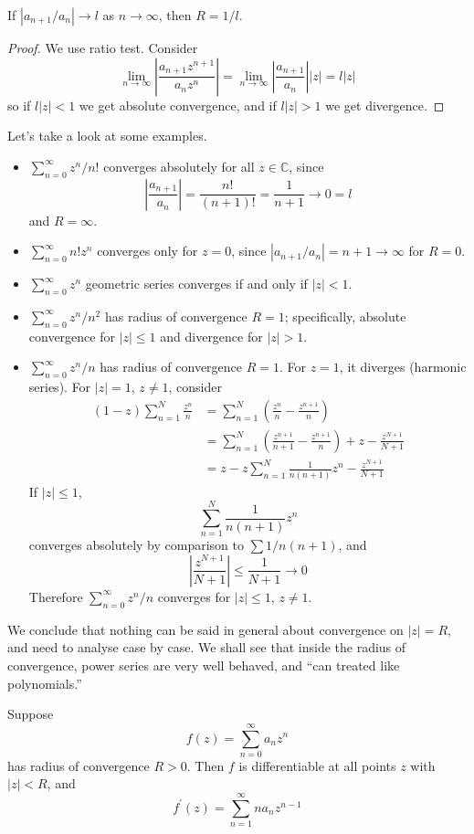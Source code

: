 \documentclass[10pt, a4paper, twoside]{report}
\begin{document}
\begin{lemma}
    If \(|a_{n+1}/a_n|\to l\) as \(n\to\infty\), then \(R=1/l\). 
\end{lemma}
\begin{proof}
    We use ratio test. Consider 
    \[\lim_{n\to\infty}\left|\frac{a_{n+1}z^{n+1}}{a_nz^n}\right|=\lim_{n\to\infty}\left|\frac{a_{n+1}}{a_n}\right||z|=l|z|\]
    so if \(l|z|<1\) we get absolute convergence, and if \(l|z|>1\) we get divergence.
\end{proof}
Let's take a look at some examples.
\begin{itemize}
    \item \(\sum_{n=0}^\infty z^n/n!\) converges absolutely for all \(z\in\mathbb{C}\), since 
    \[\left|\frac{a_{n+1}}{a_n}\right|=\frac{n!}{(n+1)!}=\frac{1}{n+1}\to 0=l\]
    and \(R=\infty\).
    \item \(\sum_{n=0}^\infty n!z^n\) converges only for \(z=0\), since \(|a_{n+1}/a_n|=n+1\to\infty\) for \(R=0\).
    \item \(\sum_{n=0}^\infty z^n\) geometric series converges if and only if \(|z|<1\).
    \item \(\sum_{n=0}^\infty z^n/n^2\) has radius of convergence \(R=1\); specifically, absolute convergence for \(|z|\leq 1\) and divergence for \(|z|>1\).
    \item \(\sum_{n=0}^\infty z^n/n\) has radius of convergence \(R=1\). For \(z=1\), it diverges (harmonic series). For \(|z|=1\), \(z\neq 1\), consider 
    \begin{align*}
        (1-z)\sum_{n=1}^{N}\frac{z^n}{n}&=\sum_{n=1}^{N}\left(\frac{z^n}{n}-\frac{z^{n+1}}{n}\right) \\
        &=\sum_{n=1}^{N}\left(\frac{z^{n+1}}{n+1}-\frac{z^{n+1}}{n}\right)+z-\frac{z^{N+1}}{N+1} \\
        &=z-z\sum_{n=1}^{N}\frac{1}{n(n+1)}z^n-\frac{z^{N+1}}{N+1}
    \end{align*}
    If \(|z|\leq 1\), 
    \[\sum_{n=1}^{N}\frac{1}{n(n+1)}z^n\] converges absolutely by comparison to \(\sum 1/n(n+1)\), and 
    \[\left|\frac{z^{N+1}}{N+1}\right|\leq\frac{1}{N+1}\to 0\]
    Therefore \(\sum_{n=0}^\infty z^n/n\) converges for \(|z|\leq 1\), \(z\neq 1\).
\end{itemize}
We conclude that nothing can be said in general about convergence on \(|z|=R\), and need to analyse case by case. We shall see that inside the radius of convergence, power series are very well behaved, and ``can treated like polynomials.''
\begin{theorem}
    Suppose 
    \[f(z)=\sum_{n=0}^{\infty}a_nz^n\]
    has radius of convergence \(R>0\). Then \(f\) is differentiable at all points \(z\) with \(|z|<R\), and 
    \[f^\prime(z)=\sum_{n=1}^{\infty}na_nz^{n-1}\]
    \label{thm:taylor_diff}
\end{theorem}
\end{document}
